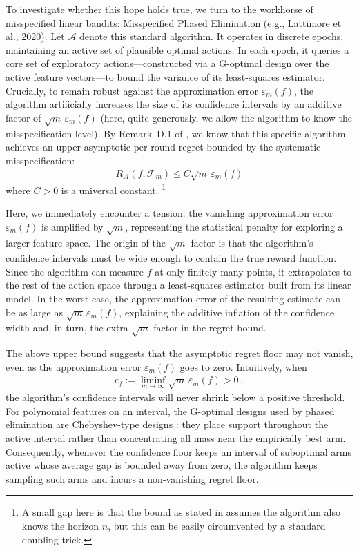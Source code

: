 \documentclass{article}
\numberwithin{theorem}{section}
\theoremstyle{definition}
\newcommand{\Fs}{\mathcal F}
\begin{document}
To investigate whether this hope holds true, we turn to the workhorse of misspecified linear bandits: Misspecified Phased Elimination (e.g., Lattimore et al., 2020). Let $\mathscr A$ denote this standard algorithm. It operates in discrete epochs, maintaining an active set of plausible optimal actions. In each epoch, it queries a core set of exploratory actions—constructed via a G-optimal design over the active feature vectors—to bound the variance of its least-squares estimator. Crucially, to remain robust against the approximation error $\varepsilon_m(f)$, the algorithm artificially increases the size of its confidence intervals
by an additive factor of $\sqrt{m}\,\varepsilon_m(f)$ (here, quite generously, we allow the algorithm to know the misspecification level). 
By Remark~D.1 of \citet{lattimore2020learning}, we know that this specific algorithm achieves an upper asymptotic per-round regret bounded by the systematic misspecification:
\[
\overline R_{\mathscr A}(f,\Fs_m) \le C \sqrt{m} \,\varepsilon_m(f)
\]
where $C>0$ is a universal constant.%
\footnote{A small gap here is that the bound as stated in \citet{lattimore2020learning} assumes the algorithm also knows the horizon $n$, but this can be easily circumvented by a standard doubling trick.} 

Here, we immediately encounter a tension: the vanishing approximation error $\varepsilon_m(f)$ is amplified by $\sqrt{m}$, representing the statistical penalty for exploring a larger feature space.
The origin of the $\sqrt{m}$ factor is that the algorithm's confidence intervals must be wide enough to contain the true reward function.
Since the algorithm can measure $f$ at only finitely many points, it extrapolates to the rest of the action space through a least-squares estimator built from its linear model. In the worst case, the approximation error of the resulting estimate can be as large as $\sqrt{m}\,\varepsilon_m(f)$, explaining the additive inflation of the confidence width and, in turn, the extra $\sqrt{m}$ factor in the regret bound.

The above upper bound suggests that the asymptotic regret floor may not vanish, even as the approximation error $\varepsilon_m(f)$ goes to zero. Intuitively, 
when
\begin{align}
    \label{eq:paradox_condition}
c_f:=\liminf_{m\to\infty} \sqrt{m}\,\varepsilon_m(f) >0\,,
\end{align}
the algorithm's confidence intervals will never shrink below a positive threshold.
For polynomial features on an interval, the G-optimal designs used by phased elimination are Chebyshev-type designs \citep{kiefer1960equivalence,guest1958spacing}: they place support throughout the active interval rather than concentrating all mass near the empirically best arm.
Consequently, whenever the confidence floor keeps an interval of suboptimal arms active whose average gap is bounded away from zero, the algorithm keeps sampling such arms and incurs a non-vanishing regret floor.
\end{document}
